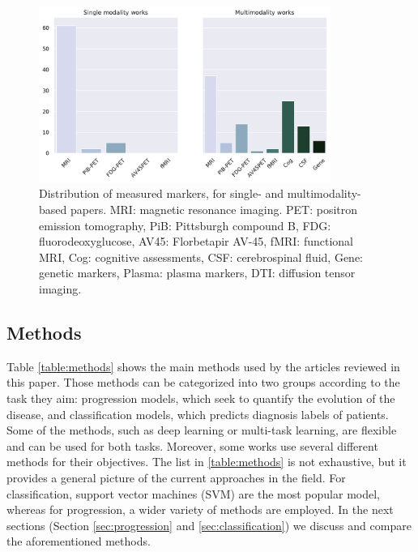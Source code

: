 \begin{figure}[!htbp]
\centering
\includegraphics[width=0.85\textwidth]{figures/review/Fig6.pdf}
    \caption[Distribution of measured markers, for single- and multi modality-based papers.]{\small Distribution of measured markers, for single- and multimodality-based papers. MRI:  magnetic resonance imaging. PET: positron emission tomography, PiB: Pittsburgh compound B, FDG: fluorodeoxyglucose, AV45: Florbetapir AV-45, fMRI: functional MRI, Cog: cognitive assessments, CSF: cerebrospinal fluid, Gene: genetic markers, Plasma: plasma markers, DTI: diffusion tensor imaging.}\label{fig:modalities}
\end{figure}

\subsection{Methods}

Table \ref{table:methods} shows the main methods used by the articles reviewed in this paper. Those methods can be  categorized into two groups according to the task they aim: progression models, which seek to quantify the evolution of the disease, and classification models, which predicts diagnosis labels of patients. Some of the methods, such as deep learning or multi-task learning, are flexible and can be used for both tasks. Moreover, some works use several different methods for their objectives. The list in \ref{table:methods} is not exhaustive, but it provides a general picture of the current approaches in the field. For classification, support vector machines (SVM) are the most popular model, whereas for progression, a wider variety of methods are employed. In the next sections (Section \ref{sec:progression} and \ref{sec:classification}) we discuss and compare the aforementioned methods. 

